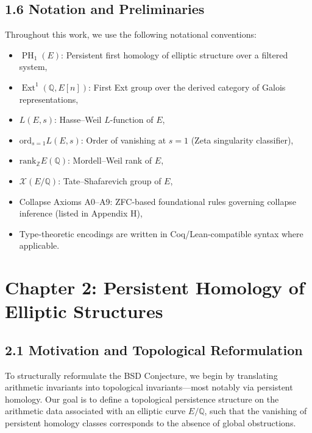 \documentclass[11pt]{article}
\DeclareMathOperator{\Ext}{Ext}
\DeclareMathOperator{\PH}{PH}
\newcommand{\QQ}{\mathbb{Q}}
\newcommand{\ZZ}{\mathbb{Z}}
\newcommand{\Sha}{\mathcal{X}}
\begin{document}
\subsection{1.6 Notation and Preliminaries}

Throughout this work, we use the following notational conventions:

\begin{itemize}
  \item $\PH_1(E)$: Persistent first homology of elliptic structure over a filtered system,
  \item $\Ext^1(\QQ,E[n])$: First Ext group over the derived category of Galois representations,
  \item $L(E,s)$: Hasse–Weil $L$-function of $E$,
  \item $\mathrm{ord}_{s=1} L(E,s)$: Order of vanishing at $s=1$ (Zeta singularity classifier),
  \item $\mathrm{rank}_{\ZZ} E(\QQ)$: Mordell–Weil rank of $E$,
  \item $\Sha(E/\QQ)$: Tate–Shafarevich group of $E$,
  \item Collapse Axioms A0–A9: ZFC-based foundational rules governing collapse inference (listed in Appendix H),
  \item Type-theoretic encodings are written in Coq/Lean-compatible syntax where applicable.
\end{itemize}




\section{Chapter 2: Persistent Homology of Elliptic Structures}

\subsection{2.1 Motivation and Topological Reformulation}

To structurally reformulate the BSD Conjecture, we begin by translating arithmetic invariants into topological invariants—most notably via persistent homology.  
Our goal is to define a topological persistence structure on the arithmetic data associated with an elliptic curve \( E/\mathbb{Q} \), such that the vanishing of persistent homology classes corresponds to the absence of global obstructions.
\end{document}
